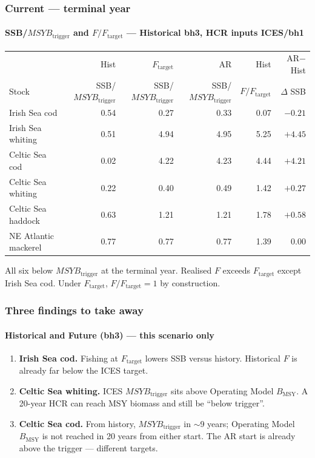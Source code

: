 \documentclass[
  aspectratio=169,
  t,
  onlytextwidth,
  10pt,
]{beamer}
\newcommand{\Ftar}{F_{\mathrm{target}}}
\newcommand{\Btrig}{MSYB_{\mathrm{trigger}}}
\newcommand{\Bmsy}{B_{\mathrm{MSY}}}
\begin{document}
\begin{frame}
  \frametitle{Current --- terminal year}
  \framesubtitle{SSB/$\Btrig$ and $F/\Ftar$ --- Historical bh3, HCR inputs ICES/bh1}

  {\footnotesize
  \begin{tabular}{@{}l rrrr r@{}}
    \toprule
    & Hist & $F_{\mathrm{target}}$ & AR & Hist & AR$-$Hist \\
    Stock & SSB/$\Btrig$ & SSB/$\Btrig$ & SSB/$\Btrig$ & $F/\Ftar$ & $\Delta$ SSB \\
    \midrule
    Irish Sea cod        & 0.54 & 0.27 & 0.33 & 0.07 & $-0.21$ \\
    Irish Sea whiting    & 0.51 & 4.94 & 4.95 & 5.25 & $+4.45$ \\
    Celtic Sea cod       & 0.02 & 4.22 & 4.23 & 4.44 & $+4.21$ \\
    Celtic Sea whiting   & 0.22 & 0.40 & 0.49 & 1.42 & $+0.27$ \\
    Celtic Sea haddock   & 0.63 & 1.21 & 1.21 & 1.78 & $+0.58$ \\
    NE Atlantic mackerel & 0.77 & 0.77 & 0.77 & 1.39 & $0.00$ \\
    \bottomrule
  \end{tabular}}

  \vspace{0.4em}
  All six below $\Btrig$ at the terminal year.
  Realised $F$ exceeds $\Ftar$ except Irish Sea cod.
  Under $F_{\mathrm{target}}$, $F/\Ftar = 1$ by construction.
\end{frame}

\begin{frame}
  \frametitle{Three findings to take away}
  \framesubtitle{Historical and Future (bh3) --- this scenario only}

  \begin{enumerate}
    \item \textbf{Irish Sea cod.} Fishing at $\Ftar$ lowers SSB versus history.
          Historical $F$ is already far below the ICES target.
    \item \textbf{Celtic Sea whiting.} ICES $\Btrig$ sits above Operating Model $\Bmsy$.
          A 20-year HCR can reach MSY biomass and still be ``below trigger''.
    \item \textbf{Celtic Sea cod.} From history, $\Btrig$ in $\sim$9 years;
          Operating Model $\Bmsy$ is not reached in 20 years from either start.
          The AR start is already above the trigger --- different targets.
  \end{enumerate}
\end{frame}
\end{document}
